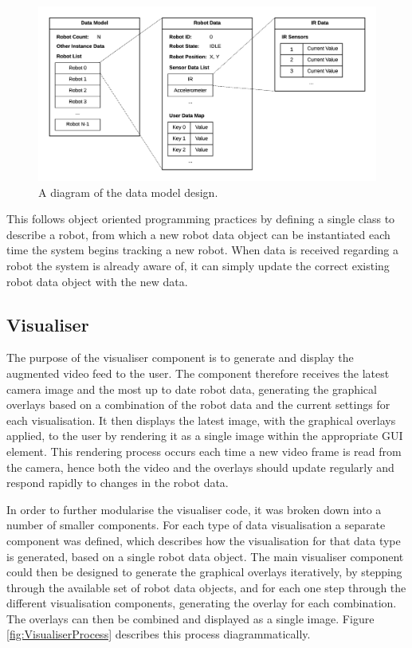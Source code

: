 \begin{figure}[h]
	\centering
	\includegraphics[scale=0.7]{Figures/DataModel.png}
	\decoRule
	\caption[Data Model Diagram]{A diagram of the data model design.}
	\label{fig:DataModel}
\end{figure}

This follows object oriented programming practices by defining a single class to describe a robot, from which a new robot data object can be instantiated each time the system begins tracking a new robot. When data is received regarding a robot the system is already aware of, it can simply update the correct existing robot data object with the new data.

\subsection{Visualiser} \label{VisualiserDesign}
The purpose of the visualiser component is to generate and display the augmented video feed to the user. The component therefore receives the latest camera image and the most up to date robot data, generating the graphical overlays based on a combination of the robot data and the current settings for each visualisation. It then displays the latest image, with the graphical overlays applied, to the user by rendering it as a single image within the appropriate GUI element. This rendering process occurs each time a new video frame is read from the camera, hence both the video and the overlays should update regularly and respond rapidly to changes in the robot data.

In order to further modularise the visualiser code, it was broken down into a number of smaller components. For each type of data visualisation a separate component was defined, which describes how the visualisation for that data type is generated, based on a single robot data object. The main visualiser component could then be designed to generate the graphical overlays iteratively, by stepping through the available set of robot data objects, and for each one step through the different visualisation components, generating the overlay for each combination. The overlays can then be combined and displayed as a single image. Figure \ref{fig:VisualiserProcess} describes this process diagrammatically.

